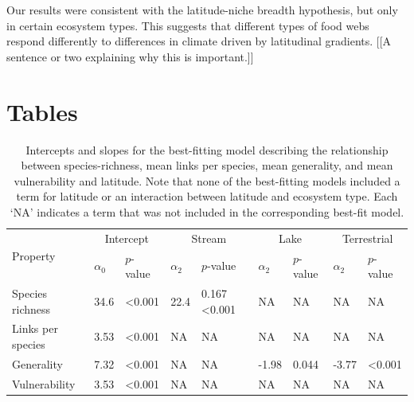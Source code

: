 \documentclass[12pt]{article}
\begin{document}
Our results were consistent with the latitude-niche breadth hypothesis, but only in certain ecosystem
types. This suggests that different types of food webs respond differently to differences in climate
driven by latitudinal gradients. [[A sentence or two explaining why this is important.]]


\newpage

\newpage

\section*{Tables}

\begin{table}[!h]
\caption{Intercepts and slopes for the best-fitting model describing the relationship between species-richness, mean links per species, mean generality, and mean vulnerability and latitude. Note that none
of the best-fitting models included a term for latitude or an interaction between latitude and ecosystem type. Each `NA' indicates a term that was not included in the corresponding best-fit model.}
\label{Latlms}
\begin{tabular}{l | l l  l l  l l  l l}

\hline
\multirow{2}{*}{Property} & \multicolumn{2}{|c}{Intercept} & \multicolumn{2}{|c}{Stream} & \multicolumn{2}{|c}{Lake} & \multicolumn{2}{|c}{Terrestrial}\\
& $\alpha_{0}$ & $p$-value & $\alpha_{2}$ & $p$-value & $\alpha_{2}$ & $p$-value & $\alpha_{2}$ &$p$-value\\
\hline
Species richness  & 34.6 & \textless0.001 & 22.4 & 0.167 \textless0.001 & NA & NA & NA & NA \\
Links per species & 3.53 & \textless0.001 & NA & NA & NA & NA & NA & NA \\
Generality        & 7.32 & \textless0.001 & NA & NA & -1.98 & 0.044 & -3.77 & \textless0.001 \\
Vulnerability     & 3.53 & \textless0.001 & NA & NA & NA & NA & NA & NA \\
\hline
\end{tabular}
\end{table}
\end{document}
